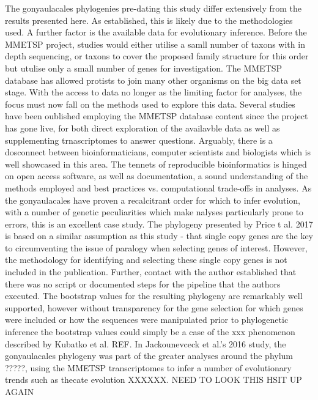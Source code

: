 \documentclass[12pt]{article}
\begin{document}
The gonyaulacales phylogenies pre-dating this study differ extensively from the results presented here. As established, this is likely due to the methodologies used. A further factor is the available data for evolutionary inference. Before the MMETSP project, studies would either utilise a samll number of taxons with in depth sequencing, or taxons to cover the proposed family structure for this order but utulise only a small number of genes for investigation. The MMETSP database has allowed protists to join many other organisms on the big data set stage. With the access to data no longer as the limiting factor for analyses, the focus must now fall on the methods used to explore this data.
Several studies have been oublished employing the MMETSP database content since the project has gone live, for both direct exploration of the availavble data as well as supplementing trnascriptomes to answer questions. Arguably, there is a dosconnect between bioinformaticians, computer scientists and biologists which is well showcased in this area. The tennets of reproducible bioinformatics is hinged on open access software, as well as documentation, a sound understanding of the methods employed and best practices vs. computational trade-offs in analyses. As the gonyaulacales have proven a recalcitrant order for which to infer evolution, with a number of genetic peculiarities which make nalyses particularly prone to errors, this is an excellent case study.
The phylogeny presented by Price t al. 2017 is based on a similar assumption as this study - that single copy genes are the key to circumventing the issue of paralogy when selecting genes of interest. However, the methodology for identifying and selecting these single copy genes is not included in the publication. Further, contact with the author established that there was no script or documented steps for the pipeline that the authors executed. The bootstrap values for the resulting phylogeny are remarkably well supported, however without transparency for the gene selection for which genes were included or how the sequences were manipulated prior to phylogenetic inference the bootstrap values could simply be a case of the xxx phenomenon described by Kubatko et al. REF.
In Jackounevceck et al.'s 2016 study, the gonyaulacales phylogeny was part of the greater analyses around the phylum ?????, using the MMETSP transcriptomes to infer a number of evolutionary trends such as thecate evolution XXXXXX. NEED TO LOOK THIS HSIT UP AGAIN
\end{document}
